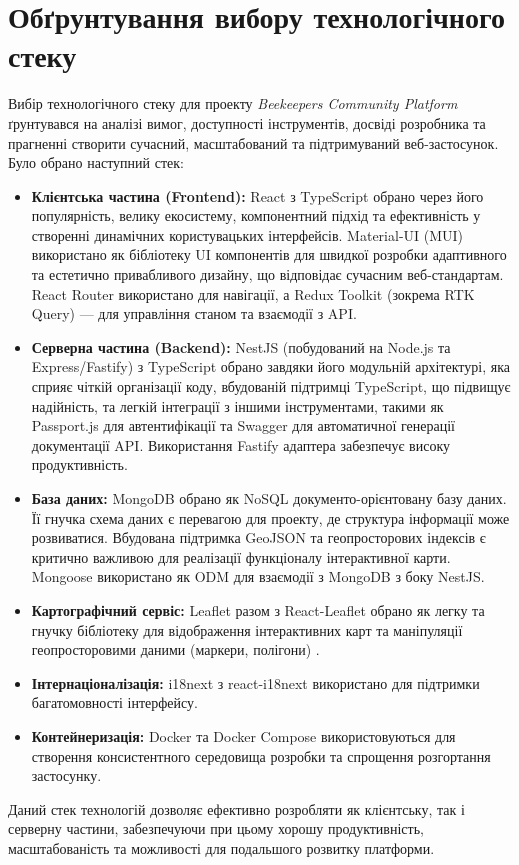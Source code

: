 \section{Обґрунтування вибору технологічного стеку}
\label{sec:tech_justification}
Вибір технологічного стеку для проекту \textit{Beekeepers Community Platform} ґрунтувався на аналізі вимог, доступності інструментів, досвіді розробника та прагненні створити сучасний, масштабований та підтримуваний веб-застосунок. Було обрано наступний стек:
\begin{itemize}
    \item \textbf{Клієнтська частина (Frontend):} React з TypeScript обрано через його популярність, велику екосистему, компонентний підхід та ефективність у створенні динамічних користувацьких інтерфейсів. Material-UI (MUI) використано як бібліотеку UI компонентів для швидкої розробки адаптивного та естетично привабливого дизайну, що відповідає сучасним веб-стандартам. React Router використано для навігації, а Redux Toolkit (зокрема RTK Query) — для управління станом та взаємодії з API.
    \item \textbf{Серверна частина (Backend):} NestJS (побудований на Node.js та Express/Fastify) з TypeScript обрано завдяки його модульній архітектурі, яка сприяє чіткій організації коду, вбудованій підтримці TypeScript, що підвищує надійність, та легкій інтеграції з іншими інструментами, такими як Passport.js для автентифікації та Swagger для автоматичної генерації документації API. Використання Fastify адаптера забезпечує високу продуктивність.
    \item \textbf{База даних:} MongoDB обрано як NoSQL документо-орієнтовану базу даних. Її гнучка схема даних є перевагою для проекту, де структура інформації може розвиватися. Вбудована підтримка GeoJSON та геопросторових індексів є критично важливою для реалізації функціоналу інтерактивної карти. Mongoose використано як ODM для взаємодії з MongoDB з боку NestJS.
    \item \textbf{Картографічний сервіс:} Leaflet разом з React-Leaflet обрано як легку та гнучку бібліотеку для відображення інтерактивних карт та маніпуляції геопросторовими даними (маркери, полігони) \cite{leaflet}.
    \item \textbf{Інтернаціоналізація:} i18next з react-i18next використано для підтримки багатомовності інтерфейсу.
    \item \textbf{Контейнеризація:} Docker та Docker Compose використовуються для створення консистентного середовища розробки та спрощення розгортання застосунку.
\end{itemize}
Даний стек технологій дозволяє ефективно розробляти як клієнтську, так і серверну частини, забезпечуючи при цьому хорошу продуктивність, масштабованість та можливості для подальшого розвитку платформи. 